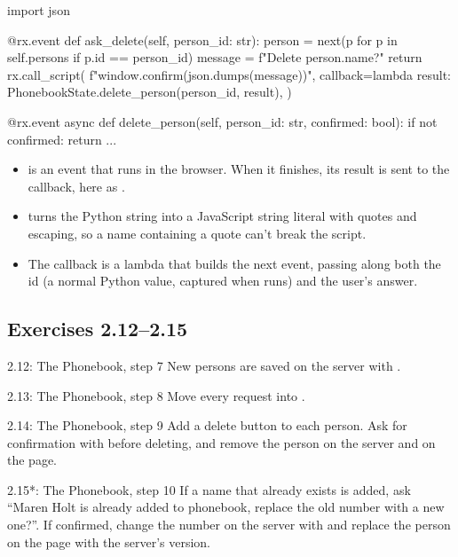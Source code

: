 \begin{py}
import json


@rx.event
def ask_delete(self, person_id: str):
	person = next(p for p in self.persons if p.id == person_id)
	message = f"Delete {person.name}?"
	return rx.call_script(
		f"window.confirm({json.dumps(message)})",
		callback=lambda result: PhonebookState.delete_person(person_id, result),
	)


@rx.event
async def delete_person(self, person_id: str, confirmed: bool):
	if not confirmed:
		return
	...
\end{py}

\begin{itemize}
\item {} is an event that runs  in the browser. When it finishes, its result is sent to the callback, here as .
\item {} turns the Python string into a JavaScript string literal with quotes and escaping, so a name containing a quote can't break the script.
\item The callback is a lambda that builds the next event, passing along both the id (a normal Python value, captured when  runs) and the user's answer.
\end{itemize}

\subsection{Exercises 2.12--2.15}

\begin{exercise}{2.12: The Phonebook, step 7}
New persons are saved on the server with .
\end{exercise}

\begin{exercise}{2.13: The Phonebook, step 8}
Move every request into .
\end{exercise}

\begin{exercise}{2.14: The Phonebook, step 9}
Add a delete button to each person. Ask for confirmation with  before deleting, and remove the person on the server and on the page.
\end{exercise}

\begin{exercise}{2.15*: The Phonebook, step 10}
If a name that already exists is added, ask ``Maren Holt is already added to phonebook, replace the old number with a new one?''. If confirmed, change the number on the server with  and replace the person on the page with the server's version.
\end{exercise}

